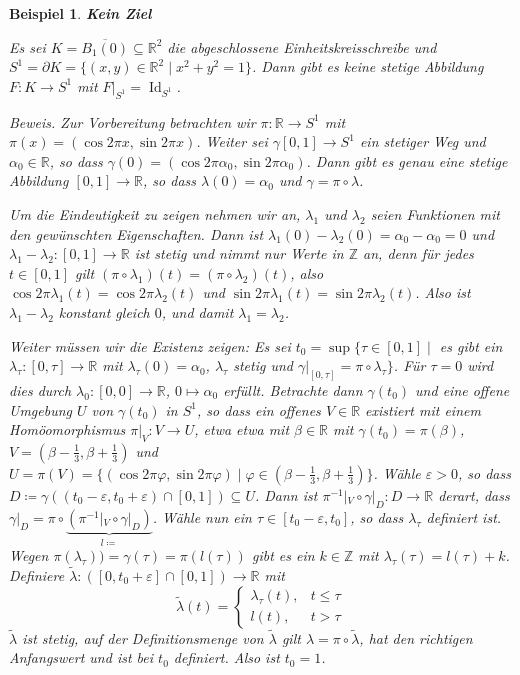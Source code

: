\documentclass[12pt]{scrbook}   %
\newtheorem{bspX}[alles]{Beispiel}
\newenvironment{bsp}[1]{\begin{bspX}{\bf #1}\par\rm}{\end{bspX}}
\newcommand{\da}{\coloneqq}
\begin{document}
\begin{bsp}{Kein Ziel}
Es sei $K = \overline{ B_1(0)} \subseteq \mathbb R^2$ die abgeschlossene Einheitskreisschreibe und $S^1=\partial K = \{(x,y)\in \mathbb R^2\mid x^2 +y^2=1\}$. Dann gibt es keine stetige Abbildung $F:K\to S^1$ mit $F|_{S^1} = \operatorname{Id}_{S^1}$.

{\it Beweis.} Zur Vorbereitung betrachten wir $\pi:\mathbb R\to S^1$ mit $\pi(x)=(\cos 2\pi x, \sin 2\pi x)$. Weiter sei $\gamma[0,1]\to S^1$ ein stetiger Weg und $\alpha_0\in \mathbb R$, so dass $\gamma(0)=(\cos 2\pi \alpha_0, \sin 2\pi \alpha_0)$. Dann gibt es genau eine stetige Abbildung $[0,1]\to \mathbb R$, so dass $\lambda(0)=\alpha_0$ und $\gamma = \pi \circ \lambda$.

Um die Eindeutigkeit zu zeigen nehmen wir an, $\lambda_1$ und $\lambda_2$ seien Funktionen mit den gewünschten Eigenschaften. Dann ist $\lambda_1(0)-\lambda_2(0)=\alpha_0-\alpha_0=0$ und $\lambda_1-\lambda_2: [0,1]\to \mathbb R$ ist stetig und nimmt nur Werte in $\mathbb Z$ an, denn für jedes $t\in[0,1]$ gilt $(\pi\circ\lambda_1)(t) = (\pi\circ\lambda_2)(t)$, also $\cos2\pi\lambda_1(t) = \cos2\pi\lambda_2(t)$ und $\sin2\pi\lambda_1(t) = \sin2\pi\lambda_2(t)$. Also ist $\lambda_1-\lambda_2$ konstant gleich $0$, und damit $\lambda_1=\lambda_2$.

Weiter müssen wir die Existenz zeigen: Es sei $t_0=\sup\{\tau\in[0,1]\mid$ es gibt ein $\lambda_\tau:[0,\tau]\to \mathbb R$ mit $\lambda_\tau(0)=\alpha_0$, $\lambda_\tau$ stetig und $\gamma|_{[0,\tau]} = \pi \circ \lambda_\tau\}$. Für $\tau=0$ wird dies durch $\lambda_0:[0,0]\to\mathbb R$, $0\mapsto\alpha_0$ erfüllt. Betrachte dann $\gamma(t_0)$ und eine offene Umgebung $U$ von $\gamma(t_0)$ in $S^1$, so dass ein offenes $V\in \mathbb R$ existiert mit einem Homöomorphismus $\pi|_V : V\to U$, etwa etwa mit $\beta\in \mathbb R$ mit $\gamma(t_0)=\pi(\beta)$, $V=(\beta-\frac13,\beta+\frac13)$ und $U=\pi(V)=\{(\cos2\pi\varphi, \sin2\pi\varphi)\mid \varphi \in (\beta-\frac13,\beta+\frac13)\}$. Wähle $\varepsilon>0$, so dass $D\da \gamma((t_0-\varepsilon,t_0+\varepsilon)\cap[0,1])\subseteq U$. Dann ist $\pi^{-1}|_V \circ \gamma|_D: D\to \mathbb R$ derart, dass $\gamma|_D=\pi \circ \underbrace{(\pi^{-1}|_V\circ \gamma|_D)}_{l\da}$. Wähle nun ein $\tau\in[t_0-\varepsilon,t_0]$, so dass $\lambda_\tau$ definiert ist. Wegen $\pi(\lambda_\tau))=\gamma(\tau)=\pi(l(\tau))$ gibt es ein $k\in\mathbb Z$ mit $\lambda_\tau(\tau)=l(\tau)+k$. Definiere $\tilde\lambda:([0,t_0+\varepsilon]\cap[0,1]) \to \mathbb R$ mit 
\[\tilde\lambda(t) =
\begin{cases}
\lambda_\tau(t),&t\le \tau\\
l(t), &t>\tau
\end{cases}
\]
$\tilde\lambda$ ist stetig, auf der Definitionsmenge von $\tilde\lambda$ gilt $\lambda = \pi \circ \tilde\lambda$, hat den richtigen Anfangswert und ist bei $t_0$ definiert. Also ist $t_0=1$.


\end{bsp}
\end{document}
